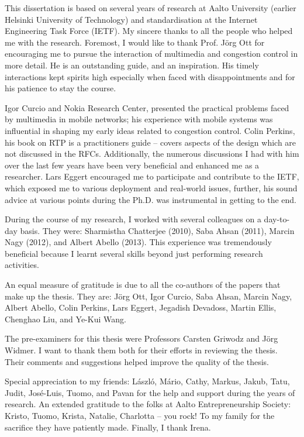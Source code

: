 \documentclass[dissertation,final]{aaltoseries} %
\begin{document}

\begin{preface}[Espoo]

This dissertation is based on several years of research at Aalto University
(earlier Helsinki University of Technology) and standardisation at the
Internet Engineering Task Force (IETF). My sincere thanks to all the people
who helped me with the research. Foremost, I would like to thank Prof.
J\"{o}rg Ott for encouraging me to pursue the interaction of multimedia and
congestion control in more detail. He is an outstanding guide, and an
inspiration. His timely interactions kept spirits high especially when faced
with disappointments and for his patience to stay the course.

Igor Curcio and Nokia Research Center, presented the practical problems faced
by multimedia in mobile networks; his experience with mobile systems was
influential in shaping my early ideas related to congestion control.
%
Colin Perkins, his book on RTP is a practitioners guide -- covers aspects of
the design which are not discussed in the RFCs. Additionally, the numerous
discussions I had with him over the last few years have been very beneficial
and enhanced me as a researcher.
%
Lars Eggert encouraged me to participate and contribute to the IETF, which
exposed me to various deployment and real-world issues, further, his sound
advice at various points during the Ph.D. was instrumental in getting to the
end.

During the course of my research, I worked with several colleagues on a
day-to-day basis. They were: Sharmistha Chatterjee (2010), Saba Ahsan (2011),
Marcin Nagy (2012), and Albert Abello (2013). This experience was tremendously
beneficial because I learnt several skills beyond just performing research 
activities.

An equal measure of gratitude is due to all the co-authors of the papers that
make up the thesis. They are: J\"{o}rg Ott, Igor Curcio, Saba Ahsan, Marcin
Nagy, Albert Abello, Colin Perkins, Lars Eggert, Jegadish Devadoss,  Martin
Ellis, Chenghao Liu, and Ye-Kui Wang.

The pre-examiners for this thesis were Professors Carsten Griwodz and J\"{o}rg
Widmer. I want to thank them both for their efforts in reviewing the thesis.
Their comments and suggestions helped improve the quality of the thesis.

Special appreciation to my friends: L\'{a}szl\'{o}, M\'{a}rio, Cathy, Markus,
Jakub, Tatu, Judit, Jos\'{e}-Luis, Tuomo, and Pavan for the help and support
during the years of research. An extended gratitude to the folks at Aalto
Entrepreneurship Society: Kristo, Tuomo, Krista, Natalie, Charlotta -- you
rock!  To my family for the sacrifice they have patiently made. Finally, I
thank Irena.

\end{preface}
\end{document}
